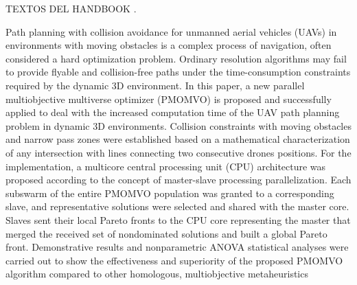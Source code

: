 \documentclass[11pt,epsf,times]{article}
\begin{document}
TEXTOS DEL HANDBOOK \cite{HandBookRobotics2016}.

Path planning with collision avoidance for unmanned aerial vehicles (UAVs) in environments with moving obstacles is a complex process of navigation, often considered a hard optimization problem. Ordinary resolution algorithms may fail to provide flyable and collision-free paths under the time-consumption constraints required by the dynamic 3D environment. In this paper, a new parallel multiobjective multiverse optimizer (PMOMVO) is proposed and successfully applied to deal with the increased computation time of the UAV path planning problem in dynamic 3D environments. Collision constraints with moving obstacles and narrow pass zones were established based on a mathematical characterization of any intersection with lines connecting two consecutive drones positions. For the implementation, a multicore central processing unit (CPU) architecture was proposed according to the concept of master-slave processing parallelization. Each subswarm of the entire PMOMVO population was granted to a corresponding slave, and representative solutions were selected and shared with the master core. Slaves sent their local Pareto fronts to the CPU core representing the master that merged the received set of nondominated solutions and built a global Pareto front. Demonstrative results and nonparametric ANOVA statistical analyses were carried out to show the effectiveness and superiority of the proposed PMOMVO algorithm compared to other homologous, multiobjective metaheuristics \cite{drones2022}
\end{document}
